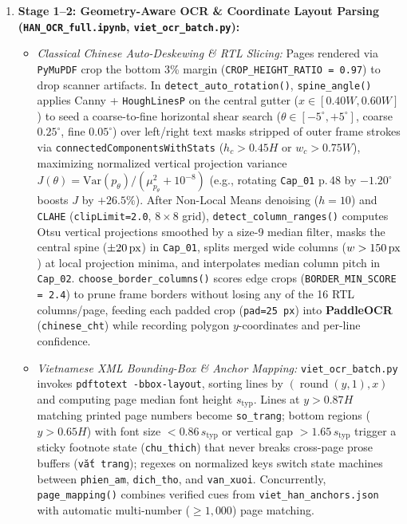 \documentclass[a4paper]{article}
\begin{document}
\vspace{-3pt}
\begin{enumerate}
  \item \textbf{Stage 1--2: Geometry-Aware OCR \& Coordinate Layout Parsing (\texttt{HAN\_OCR\_full.ipynb}, \texttt{viet\_ocr\_batch.py}):}
  \begin{itemize}
    \item \textit{Classical Chinese Auto-Deskewing \& RTL Slicing:} Pages rendered via \texttt{PyMuPDF} crop the bottom 3\% margin (\texttt{CROP\_HEIGHT\_RATIO = 0.97}) to drop scanner artifacts. In \texttt{detect\_auto\_rotation()}, \texttt{spine\_angle()} applies Canny + \texttt{HoughLinesP} on the central gutter ($x\in[0.40W, 0.60W]$) to seed a coarse-to-fine horizontal shear search ($\theta \in [-5^\circ, +5^\circ]$, coarse $0.25^\circ$, fine $0.05^\circ$) over left/right text masks stripped of outer frame strokes via \texttt{connectedComponentsWithStats} ($h_c>0.45H$ or $w_c>0.75W$), maximizing normalized vertical projection variance $J(\theta)=\mathrm{Var}(p_\theta)/(\mu_{p_\theta}^2+10^{-8})$ (e.g., rotating \texttt{Cap\_01} p.\,48 by $-1.20^\circ$ boosts $J$ by $+26.5\%$). After Non-Local Means denoising ($h{=}10$) and \texttt{CLAHE} (\texttt{clipLimit=2.0}, $8{\times}8$ grid), \texttt{detect\_column\_ranges()} computes Otsu vertical projections smoothed by a size-9 median filter, masks the central spine ($\pm 20\text{\,px}$) in \texttt{Cap\_01}, splits merged wide columns ($w>150\text{\,px}$) at local projection minima, and interpolates median column pitch in \texttt{Cap\_02}. \texttt{choose\_border\_columns()} scores edge crops (\texttt{BORDER\_MIN\_SCORE = 2.4}) to prune frame borders without losing any of the 16 RTL columns/page, feeding each padded crop (\texttt{pad=25\,px}) into \textbf{PaddleOCR} (\texttt{chinese\_cht}) while recording polygon $y$-coordinates and per-line confidence.
    \item \textit{Vietnamese XML Bounding-Box \& Anchor Mapping:} \texttt{viet\_ocr\_batch.py} invokes \texttt{pdftotext -bbox-layout}, sorting lines by $(\operatorname{round}(y,1), x)$ and computing page median font height $s_{\text{typ}}$. Lines at $y>0.87H$ matching printed page numbers become \texttt{so\_trang}; bottom regions ($y>0.65H$) with font size $<0.86\,s_{\text{typ}}$ or vertical gap $>1.65\,s_{\text{typ}}$ trigger a sticky footnote state (\texttt{chu\_thich}) that never breaks cross-page prose buffers (\texttt{vắt trang}); regexes on normalized keys switch state machines between \texttt{phien\_am}, \texttt{dich\_tho}, and \texttt{van\_xuoi}. Concurrently, \texttt{page\_mapping()} combines verified cues from \texttt{viet\_han\_anchors.json} with automatic multi-number ($\ge 1{,}000$) page matching.
  \end{itemize}


\end{enumerate}
\end{document}

